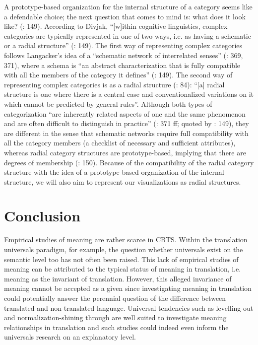 A prototype-based organization for the internal structure of a category seems like a defendable choice; the next question that comes to mind is: what does it look like? (\citealt{divjak_structuring_2010}: 149). According to Divjak, “[w]ithin cognitive linguistics, complex categories are typically represented in one of two ways, i.e. as having a schematic or a radial structure” (\citealt{divjak_structuring_2010}: 149). The first way of representing complex categories follows Langacker’s idea of a “schematic network of interrelated senses” (\citealt{langacker_foundations_1987}: 369, 371), where a schema is “an abstract characterization that is fully compatible with all the members of the category it defines” (\citealt{divjak_structuring_2010}: 149). The second way of representing complex categories is as a radial structure (\citealt{lakoff_women_1987}: 84): “[a] radial structure is one where there is a central case and conventionalized variations on it which cannot be predicted by general rules”. Although both types of categorization “are inherently related aspects of one and the same phenomenon and are often difficult to distinguish in practice” (\citealt{langacker_foundations_1987}: 371 ff; quoted by \citealt{divjak_structuring_2010}: 149), they are different in the sense that schematic networks require full compatibility with all the category members (a checklist of necessary and sufficient attributes), whereas radial category structures are prototype-based, implying that there are degrees of membership (\citealt{divjak_structuring_2010}: 150). Because of the compatibility of the radial category structure with the idea of a prototype-based organization of the internal structure, we will also aim to represent our visualizations as radial structures.


\section{\label{sec:2.5}  Conclusion}

Empirical studies of meaning are rather scarce in CBTS. Within the translation universals paradigm, for example, the question whether universals exist on the semantic level too has not often been raised. This lack of empirical studies of meaning can be attributed to the typical status of meaning in translation, i.e. meaning as the invariant of translation. However, this alleged invariance of meaning cannot be accepted as a given since investigating meaning in translation could potentially answer the perennial question of the difference between translated and non-translated language. Universal tendencies such as levelling-out and normalization-shining through are well suited to investigate meaning relationships in translation and such studies could indeed even inform the universals research on an explanatory level.



